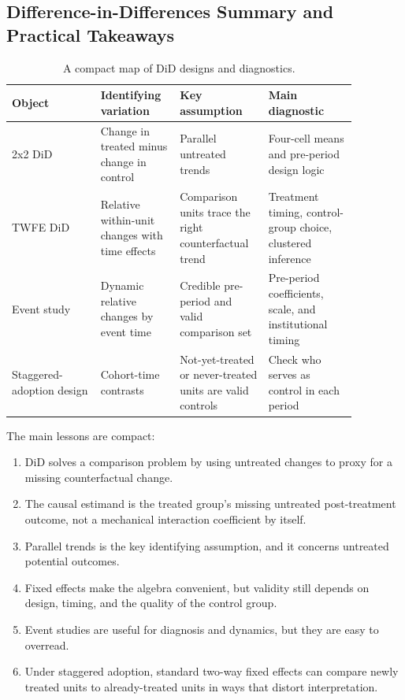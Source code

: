 \subsection{Difference-in-Differences Summary and Practical Takeaways}
\begin{table}[h]
\centering
\small
\begin{tabular}{p{0.23\linewidth}p{0.19\linewidth}p{0.22\linewidth}p{0.23\linewidth}}
\toprule
Object & Identifying variation & Key assumption & Main diagnostic \\
\midrule
2x2 \ac{DiD} & Change in treated minus change in control & Parallel untreated trends & Four-cell means and pre-period design logic \\
TWFE \ac{DiD} & Relative within-unit changes with time effects & Comparison units trace the right counterfactual trend & Treatment timing, control-group choice, clustered inference \\
Event study & Dynamic relative changes by event time & Credible pre-period and valid comparison set & Pre-period coefficients, scale, and institutional timing \\
Staggered-adoption design & Cohort-time contrasts & Not-yet-treated or never-treated units are valid controls & Check who serves as control in each period \\
\bottomrule
\end{tabular}
\caption{A compact map of \ac{DiD} designs and diagnostics.}
\label{tab:did_summary}
\end{table}

The main lessons are compact:
\begin{enumerate}
\item \ac{DiD} solves a comparison problem by using untreated changes to proxy for a missing counterfactual change.
\item The causal estimand is the treated group's missing untreated post-treatment outcome, not a mechanical interaction coefficient by itself.
\item Parallel trends is the key identifying assumption, and it concerns untreated potential outcomes.
\item Fixed effects make the algebra convenient, but validity still depends on design, timing, and the quality of the control group.
\item Event studies are useful for diagnosis and dynamics, but they are easy to overread.
\item Under staggered adoption, standard two-way fixed effects can compare newly treated units to already-treated units in ways that distort interpretation.
\end{enumerate}

